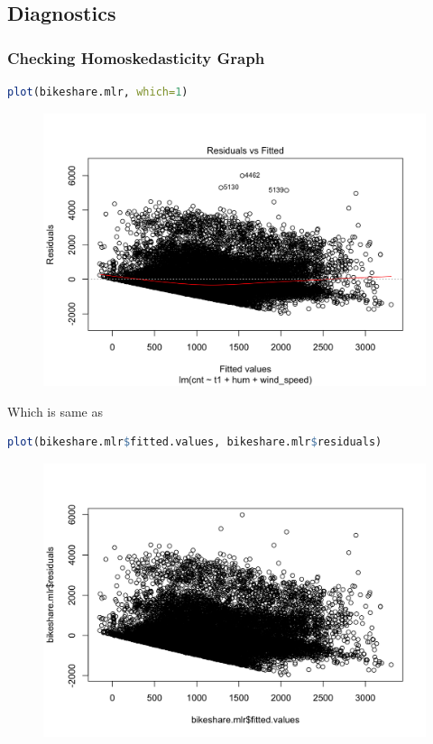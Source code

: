 \documentclass[11pt,a4paper]{article}
\begin{document}
\subsection{Diagnostics}
\subsubsection{Checking Homoskedasticity Graph
}
\begin{lstlisting}[language=R]
plot(bikeshare.mlr, which=1)
\end{lstlisting}
\begin{center}\begin{figure}[htbp]
  \centering
  \includegraphics[scale=0.2]{d1}
  \caption{}
  \label{}
\end{figure}\end{center}
Which is same as
\begin{lstlisting}[language=R]
plot(bikeshare.mlr$fitted.values, bikeshare.mlr$residuals)
\end{lstlisting}
\begin{center}\begin{figure}[htbp]
  \centering
  \includegraphics[scale=0.2]{d2.png}
  \caption{}
  \label{}
\end{figure}\end{center}
\end{document}

